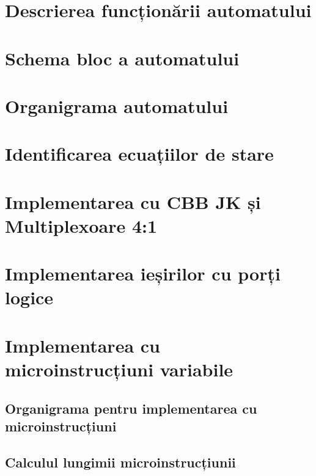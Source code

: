 \documentclass[a4paper,12pt]{article}
\begin{document}


\newpage
\tableofcontents
\newpage

\section{Descrierea funcționării automatului}


\section{Schema bloc a automatului}

\newpage

\section{Organigrama automatului}

\newpage

\section{Identificarea ecuațiilor de stare}

\newpage

\section{Implementarea cu CBB JK și Multiplexoare 4:1}

\newpage

\section{Implementarea ieșirilor cu porți logice}

\newpage

\section{Implementarea cu microinstrucțiuni variabile}
\subsection{Organigrama pentru implementarea cu microinstrucțiuni}


\subsection{Calculul lungimii microinstrucțiunii}

\end{document}
